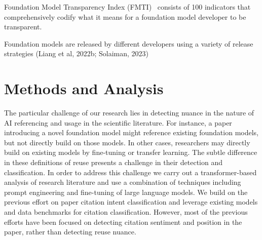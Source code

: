 \documentclass[acmsmall,authorversion]{acmart}
\begin{document}
Foundation Model Transparency Index (FMTI)~\cite{bommasani2023foundation} consists of 100 indicators that comprehensively codify what it means for a foundation model developer to be transparent.

Foundation models are released by different developers using a variety of release strategies (Liang et al, 2022b; Solaiman, 2023)

\section{Methods and Analysis}

The particular challenge of our research lies in detecting nuance in the nature of AI referencing and usage in the scientific literature. For instance, a paper introducing a novel foundation model might reference existing foundation models, but not directly build on those models. In other cases, researchers may directly build on existing models by fine-tuning or transfer learning. The subtle difference in these definitions of reuse presents a challenge in their detection and classification. In order to address this challenge we carry out a transformer-based analysis of research literature and use a combination of techniques including prompt engineering and fine-tuning of large language models. We build on the previous effort on paper citation intent classification and leverage existing models and data benchmarks for citation classification. However, most of the previous efforts have been focused on detecting citation sentiment and position in the paper, rather than detecting reuse nuance. 
\end{document}
